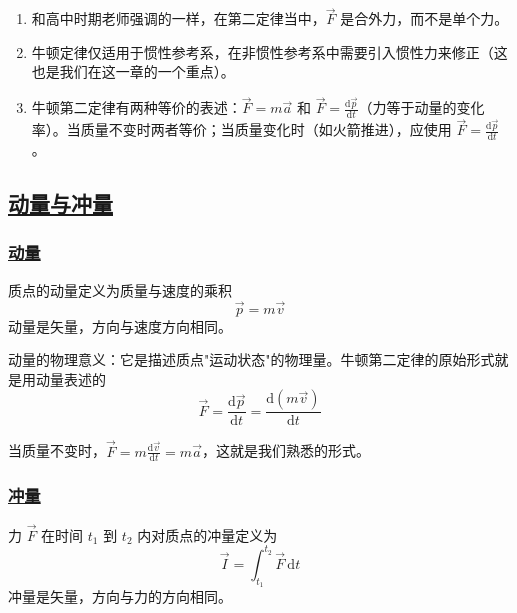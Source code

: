 \begin{remark}
    \begin{enumerate}
        \item 和高中时期老师强调的一样，在第二定律当中，$\vec{F}$ 是合外力，而不是单个力。
        \item 牛顿定律仅适用于惯性参考系，在非惯性参考系中需要引入惯性力来修正（这也是我们在这一章的一个重点）。
        \item 牛顿第二定律有两种等价的表述：$\vec{F} = m\vec{a}$ 和 $\vec{F} = \frac{\mathrm{d}\vec{p}}{\mathrm{d}t}$（力等于动量的变化率）。当质量不变时两者等价；当质量变化时（如火箭推进），应使用 $\vec{F} = \frac{\mathrm{d}\vec{p}}{\mathrm{d}t}$。
    \end{enumerate}
\end{remark}

\subsection{\protect\hyperlink{:}{动量与冲量}}

\subsubsection{\protect\hyperlink{:}{动量}}

\begin{definition}[动量]
    质点的动量定义为质量与速度的乘积
    \begin{equation}
        \vec{p} = m\vec{v}
    \end{equation}
    动量是矢量，方向与速度方向相同。
\end{definition}

动量的物理意义：它是描述质点"运动状态"的物理量。牛顿第二定律的原始形式就是用动量表述的
\begin{equation}
    \vec{F} = \frac{\mathrm{d}\vec{p}}{\mathrm{d}t} = \frac{\mathrm{d}(m\vec{v})}{\mathrm{d}t}
\end{equation}

当质量不变时，$\vec{F} = m\frac{\mathrm{d}\vec{v}}{\mathrm{d}t} = m\vec{a}$，这就是我们熟悉的形式。

\subsubsection{\protect\hyperlink{:}{冲量}}

\begin{definition}[冲量]
    力 $\vec{F}$ 在时间 $t_1$ 到 $t_2$ 内对质点的冲量定义为
    \begin{equation}
        \vec{I} = \int_{t_1}^{t_2} \vec{F}\,\mathrm{d}t
    \end{equation}
    冲量是矢量，方向与力的方向相同。
\end{definition}

